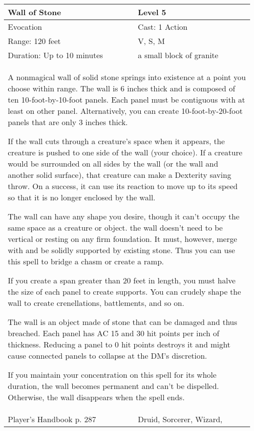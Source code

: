 \documentclass[11pt]{report}
\begin{document}
\begin{table}[H]
	\begin{tabular}{||p{6cm}|p{6cm}||}
		\hline\hline
		\bf{Wall of Stone} & Level 5\\ \hline
		Evocation & Cast: 1 Action\\ \hline
		Range: 120 feet & V, S, M\\ \hline
		Duration: Up to 10 minutes & a small block of granite\\ \hline
		\multicolumn{2}{||p{12cm}||}{A nonmagical wall of solid stone springs into existence at a point you choose within range.
The wall is 6 inches thick and is composed of ten 10-foot-by-10-foot panels. Each panel must be contiguous with at least on other panel. Alternatively, you can create 10-foot-by-20-foot panels that are only 3 inches thick.

If the wall cuts through a creature’s space when it appears, the creature is pushed to one side of the wall (your choice). If a creature would be surrounded on all sides by the wall (or the wall and another solid surface), that creature can make a Dexterity saving throw. On a success, it can use its reaction to move up to its speed so that it is no longer enclosed by the wall.

The wall can have any shape you desire, though it can’t occupy the same space as a creature or object. the wall doesn’t need to be vertical or resting on any firm foundation. It must, however, merge with and be solidly supported by existing stone. Thus you can use this spell to bridge a chasm or create a ramp.

If you create a span greater than 20 feet in length, you must halve the size of each panel to create supports. You can crudely shape the wall to create crenellations, battlements, and so on.

The wall is an object made of stone that can be damaged and thus breached. Each panel has AC 15 and 30 hit points per inch of thickness. Reducing a panel to 0 hit points destroys it and might cause connected panels to collapse at the DM’s discretion.

If you maintain your concentration on this spell for its whole duration, the wall becomes permanent and can’t be dispelled. Otherwise, the wall disappears when the spell ends.}\\ \hline
Player's Handbook p. 287 & Druid, Sorcerer, Wizard, \\ \hline\hline
	\end{tabular}
\end{table}
\end{document}
